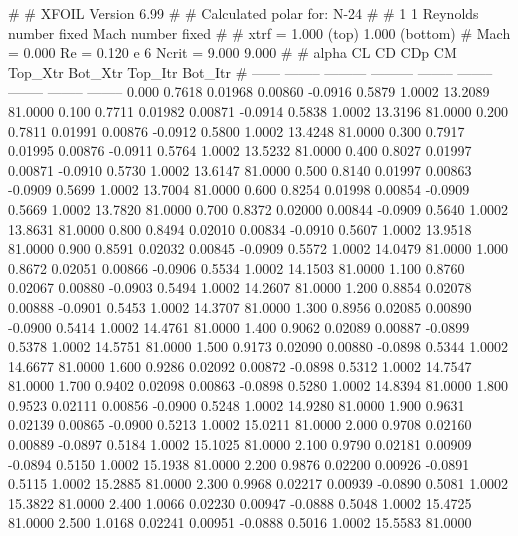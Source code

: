 #  
#       XFOIL         Version 6.99
#  
# Calculated polar for: N-24                                            
#  
# 1 1 Reynolds number fixed          Mach number fixed         
#  
# xtrf =   1.000 (top)        1.000 (bottom)  
# Mach =   0.000     Re =     0.120 e 6     Ncrit =   9.000  9.000
#  
#   alpha    CL        CD       CDp       CM     Top_Xtr  Bot_Xtr  Top_Itr  Bot_Itr
#  ------ -------- --------- --------- -------- -------- -------- -------- --------
   0.000   0.7618   0.01968   0.00860  -0.0916   0.5879   1.0002  13.2089  81.0000
   0.100   0.7711   0.01982   0.00871  -0.0914   0.5838   1.0002  13.3196  81.0000
   0.200   0.7811   0.01991   0.00876  -0.0912   0.5800   1.0002  13.4248  81.0000
   0.300   0.7917   0.01995   0.00876  -0.0911   0.5764   1.0002  13.5232  81.0000
   0.400   0.8027   0.01997   0.00871  -0.0910   0.5730   1.0002  13.6147  81.0000
   0.500   0.8140   0.01997   0.00863  -0.0909   0.5699   1.0002  13.7004  81.0000
   0.600   0.8254   0.01998   0.00854  -0.0909   0.5669   1.0002  13.7820  81.0000
   0.700   0.8372   0.02000   0.00844  -0.0909   0.5640   1.0002  13.8631  81.0000
   0.800   0.8494   0.02010   0.00834  -0.0910   0.5607   1.0002  13.9518  81.0000
   0.900   0.8591   0.02032   0.00845  -0.0909   0.5572   1.0002  14.0479  81.0000
   1.000   0.8672   0.02051   0.00866  -0.0906   0.5534   1.0002  14.1503  81.0000
   1.100   0.8760   0.02067   0.00880  -0.0903   0.5494   1.0002  14.2607  81.0000
   1.200   0.8854   0.02078   0.00888  -0.0901   0.5453   1.0002  14.3707  81.0000
   1.300   0.8956   0.02085   0.00890  -0.0900   0.5414   1.0002  14.4761  81.0000
   1.400   0.9062   0.02089   0.00887  -0.0899   0.5378   1.0002  14.5751  81.0000
   1.500   0.9173   0.02090   0.00880  -0.0898   0.5344   1.0002  14.6677  81.0000
   1.600   0.9286   0.02092   0.00872  -0.0898   0.5312   1.0002  14.7547  81.0000
   1.700   0.9402   0.02098   0.00863  -0.0898   0.5280   1.0002  14.8394  81.0000
   1.800   0.9523   0.02111   0.00856  -0.0900   0.5248   1.0002  14.9280  81.0000
   1.900   0.9631   0.02139   0.00865  -0.0900   0.5213   1.0002  15.0211  81.0000
   2.000   0.9708   0.02160   0.00889  -0.0897   0.5184   1.0002  15.1025  81.0000
   2.100   0.9790   0.02181   0.00909  -0.0894   0.5150   1.0002  15.1938  81.0000
   2.200   0.9876   0.02200   0.00926  -0.0891   0.5115   1.0002  15.2885  81.0000
   2.300   0.9968   0.02217   0.00939  -0.0890   0.5081   1.0002  15.3822  81.0000
   2.400   1.0066   0.02230   0.00947  -0.0888   0.5048   1.0002  15.4725  81.0000
   2.500   1.0168   0.02241   0.00951  -0.0888   0.5016   1.0002  15.5583  81.0000
